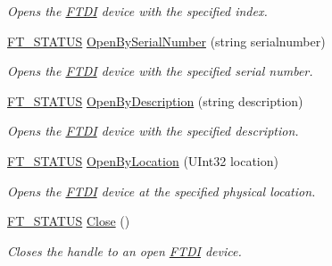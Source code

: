 \begin{DoxyCompactItemize}
\begin{DoxyCompactList}\small\item\em Opens the \mbox{\hyperlink{class_f_t_d2_x_x___n_e_t_1_1_f_t_d_i}{F\+T\+DI}} device with the specified index. \end{DoxyCompactList}\item 
\mbox{\hyperlink{class_f_t_d2_x_x___n_e_t_1_1_f_t_d_i_aabe20ad905cc4ccc1e35dd5b877d9a83}{F\+T\+\_\+\+S\+T\+A\+T\+US}} \mbox{\hyperlink{class_f_t_d2_x_x___n_e_t_1_1_f_t_d_i_af70a7ba5bf09ea743c0d9e4f75609dc3}{Open\+By\+Serial\+Number}} (string serialnumber)
\begin{DoxyCompactList}\small\item\em Opens the \mbox{\hyperlink{class_f_t_d2_x_x___n_e_t_1_1_f_t_d_i}{F\+T\+DI}} device with the specified serial number. \end{DoxyCompactList}\item 
\mbox{\hyperlink{class_f_t_d2_x_x___n_e_t_1_1_f_t_d_i_aabe20ad905cc4ccc1e35dd5b877d9a83}{F\+T\+\_\+\+S\+T\+A\+T\+US}} \mbox{\hyperlink{class_f_t_d2_x_x___n_e_t_1_1_f_t_d_i_a72b3a7a790a74afa0611b5090fe46c08}{Open\+By\+Description}} (string description)
\begin{DoxyCompactList}\small\item\em Opens the \mbox{\hyperlink{class_f_t_d2_x_x___n_e_t_1_1_f_t_d_i}{F\+T\+DI}} device with the specified description. \end{DoxyCompactList}\item 
\mbox{\hyperlink{class_f_t_d2_x_x___n_e_t_1_1_f_t_d_i_aabe20ad905cc4ccc1e35dd5b877d9a83}{F\+T\+\_\+\+S\+T\+A\+T\+US}} \mbox{\hyperlink{class_f_t_d2_x_x___n_e_t_1_1_f_t_d_i_ab6a4d39b5e88b513e2a8f588bdd9481e}{Open\+By\+Location}} (U\+Int32 location)
\begin{DoxyCompactList}\small\item\em Opens the \mbox{\hyperlink{class_f_t_d2_x_x___n_e_t_1_1_f_t_d_i}{F\+T\+DI}} device at the specified physical location. \end{DoxyCompactList}\item 
\mbox{\hyperlink{class_f_t_d2_x_x___n_e_t_1_1_f_t_d_i_aabe20ad905cc4ccc1e35dd5b877d9a83}{F\+T\+\_\+\+S\+T\+A\+T\+US}} \mbox{\hyperlink{class_f_t_d2_x_x___n_e_t_1_1_f_t_d_i_afdbec3db2b73f8873bcfee5ce2984be7}{Close}} ()
\begin{DoxyCompactList}\small\item\em Closes the handle to an open \mbox{\hyperlink{class_f_t_d2_x_x___n_e_t_1_1_f_t_d_i}{F\+T\+DI}} device. \end{DoxyCompactList}\item 

\end{DoxyCompactItemize}
